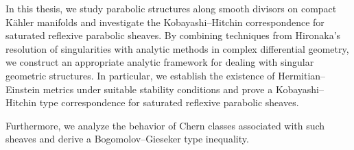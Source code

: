 

\begin{abstract}

本文研究了紧 Kähler 流形上带有光滑除子的抛物结构，并在此背景下讨论饱和自反抛物层的 Kobayashi--Hitchin 对应问题。通过结合 Hironaka 奇点解析理论，对具有奇性结构的层进行适当的解析化处理，并在解析空间上构造适合的 Hermitian 度量与连接，然后利用 Hermitian--Yang--Mills 流说明在适当的稳定性条件下，饱和自反抛物层与 Hermitian--Einstein 度量之间的对应关系，从而将经典 Kobayashi--Hitchin 对应推广到更一般的几何情形。

此外，本文进一步研究了相关向量丛与自反层的 Chern 类性质，并在此基础上建立了一类 Bogomolov--Gieseker 型不等式。



\end{abstract}

\begin{abstract*}
  
  In this thesis, we study parabolic structures along smooth divisors on compact Kähler manifolds and investigate the Kobayashi--Hitchin correspondence for saturated reflexive parabolic sheaves. By combining techniques from Hironaka's resolution of singularities with analytic methods in complex differential geometry, we construct an appropriate analytic framework for dealing with singular geometric structures. In particular, we establish the existence of Hermitian--Einstein metrics under suitable stability conditions and prove a Kobayashi--Hitchin type correspondence for saturated reflexive parabolic sheaves.

  Furthermore, we analyze the behavior of Chern classes associated with such sheaves and derive a Bogomolov--Gieseker type inequality.


\end{abstract*}
